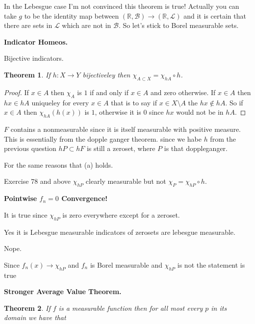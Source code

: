 \documentclass[letter]{article}
\newtheorem{theorem}{Theorem}
\newenvironment{menumerate}{%
  \edef\backupindent{\the\parindent}%
  \enumerate%
  \setlength{\parindent}{\backupindent}%
}{\endenumerate}
\begin{document}
\begin{menumerate}
	 In the Lebesgue case I'm not convinced this theorem is true! Actually you can take $g$ to be the identity map between $(\mathbb{R}, \mathcal{B}) \to (\mathbb{R}, \mathcal{L})$ and it is certain that there are sets in $\mathcal{L}$ which are not in $\mathcal{B}$. So let's stick to Borel measurable sets.
	
	\item \textbf{Indicator Homeos.}
	\begin{menumerate}
		\item Bijective indicators.
		\begin{theorem}
			If $h: X \to Y$ bijectiveley then $\chi_{A \subset X} = \chi_{hA} \circ h$.
		\end{theorem}
		\begin{proof}
			If $x \in A$ then $\chi_A$ is $1$ if and only if $x \in A$ and zero otherwise.	
			If $x\in A$ then $hx \in hA$ uniqueley for every $x \in A$ that is to say if $x\in X \setminus A$ the $hx \notin hA$. So if $x \in A$ then $\chi_{hA}(h(x))$ is $1$, 
			otherwise it is $0$ since $hx$ would not be in $hA$.
		\end{proof}
		\item $F$ contains a nonmeasurable since it is itself measurable with positive measure. 
		This is essentially from the dopple ganger theorem. since we habe $h$ from the previous question $hP \subset hF$ is still
		a zeroset, where $P$ is that doppleganger.
		\item For the same reasons that (a) holds.
		\item Exercise 78 and above $\chi_{hP}$ clearly measurable but not $\chi_P = \chi_{hP} \circ h$.
	\end{menumerate}
	\item \textbf{Pointwise $f_n = 0$ Convergence!}
	\begin{menumerate}
		\item It is true since $\chi_{hP}$ is zero everywhere except for a zeroset.
		\item Yes it is Lebesgue measurable indicators of zerosets are lebesgue measurable.
		\item Nope.
		\item Since $f_n(x) \to \chi_{hP}$ and $f_n$ is Borel measurable and $\chi_{hP}$ is not the statement is true
	\end{menumerate}
	\item \textbf{Stronger Average Value Theorem.}
	\begin{theorem}
		If $f$ is a measurable function then for all most every $p$ in its domain we have that 

\end{theorem}
\end{menumerate}
\end{document}
